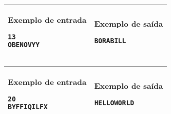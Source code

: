 \begin{table}[!h]
\centering
\begin{tabular}{|l|l|}
\hline
\begin{minipage}[t]{3in}
\textbf{Exemplo de entrada}
\begin{verbatim}
13
OBENOVYY
\end{verbatim}
\vspace{1mm}
\end{minipage}
&
\begin{minipage}[t]{3in}
\textbf{Exemplo de saída}
\begin{verbatim}
BORABILL
\end{verbatim}
\vspace{1mm}
\end{minipage} \\
\hline
\end{tabular}
\end{table}

\begin{table}[!h]
\centering
\begin{tabular}{|l|l|}
\hline
\begin{minipage}[t]{3in}
\textbf{Exemplo de entrada}
\begin{verbatim}
20
BYFFIQILFX
\end{verbatim}
\vspace{1mm}
\end{minipage}
&
\begin{minipage}[t]{3in}
\textbf{Exemplo de saída}
\begin{verbatim}
HELLOWORLD
\end{verbatim}
\vspace{1mm}
\end{minipage} \\
\hline
\end{tabular}
\end{table}
